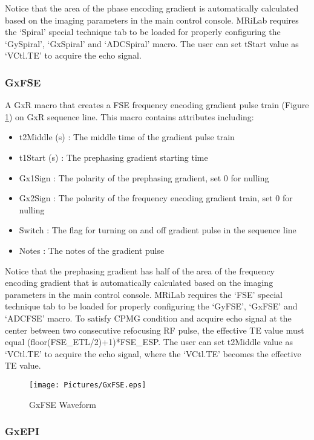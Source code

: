 \documentclass{book}%
\begin{document}
Notice that the area of the phase encoding gradient is automatically calculated based on the imaging parameters in the main control console. MRiLab requires the `Spiral' special technique tab to be loaded for properly configuring the `GySpiral', `GxSpiral' and `ADCSpiral' macro. The user can set tStart value as `VCtl.TE' to acquire the echo signal.

\subsubsection{GxFSE}

A GxR macro that creates a FSE frequency encoding gradient pulse train (Figure \ref{fig:GxFSE}) on GxR sequence line. This macro contains attributes including:

\begin{itemize}
	\item t2Middle (s) : The middle time of the gradient pulse train
	\item t1Start (s) : The prephasing gradient starting time
	\item Gx1Sign : The polarity of the prephasing gradient, set 0 for nulling
	\item Gx2Sign : The polarity of the frequency encoding gradient train, set 0 for nulling
	\item Switch : The flag for turning on and off gradient pulse in the sequence line
	\item Notes : The notes of the gradient pulse 
\end{itemize}

Notice that the prephasing gradient has half of the area of the frequency encoding gradient that is automatically calculated based on the imaging parameters in the main control console. MRiLab requires the `FSE' special technique tab to be loaded for properly configuring the `GyFSE', `GxFSE' and `ADCFSE' macro. To satisfy CPMG condition and acquire echo signal at the center between two consecutive refocusing RF pulse, the effective TE value must equal (floor(FSE\_ETL/2)+1)*FSE\_ESP. The user can set t2Middle value as `VCtl.TE' to acquire the echo signal, where the `VCtl.TE' becomes the effective TE value.

\begin{figure}[htbp]
	\centering
		\texttt{[image: Pictures/GxFSE.eps]}
	\caption{GxFSE Waveform}
	\label{fig:GxFSE}
\end{figure}

\subsubsection{GxEPI}
\end{document}
